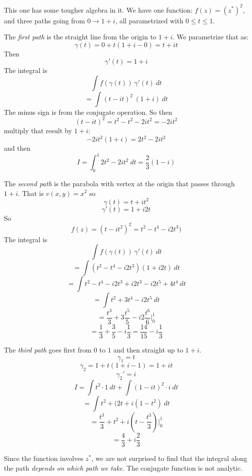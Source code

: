 \documentclass[11pt, oneside]{article}
\begin{document}
This one has some tougher algebra in it.  We have one function: $f(z) = (z^*)^2$, and three paths going from $0 \rightarrow 1 + i$, all parametrized with $0 \le t \le 1$.

The \emph{first path} is the straight line from the origin to $1 + i$.  We parametrize that as:
\[ \gamma(t) = 0 + t(1 + i - 0) = t + it \]
Then
\[ \gamma'(t) = 1 + i \]
The integral is
\[ \int f(\gamma(t)) \ \gamma'(t) \ dt \]
\[ = \int (t - it)^2 \ (1 + i) \ dt \]
The minus sign is from the conjugate operation.  So then
\[ (t - it)^2 = t^2 - t^2 - 2i t^2 = -2it^2 \]
multiply that result by $1 + i$:
\[ -2it^2 (1 + i) = 2t^2 -2it^2 \]
and then
\[ I = \int_0^1 2t^2 - 2it^2 \ dt = \frac{2}{3} (1 - i) \]

The \emph{second path} is the parabola with vertex at the origin that passes through $1 + i$.  That is $v(x,y) = x^2$ so
\[ \gamma(t) = t + it^2\]
\[ \gamma'(t) = 1 + i2t \]
So
\[ f(z) = (t - it^2)^2 = t^2 - t^4 - i2t^3) \]
The integral is
\[ \int f(\gamma(t)) \ \gamma'(t) \ dt \]
\[ = \int (t^2 - t^4 - i2t^3)(1 + i2t) \ dt \]
\[ = \int t^2 - t^4 - i2t^3 + i2t^3 - i2t^5 + 4t^4 \ dt \]
\[ = \int t^2 + 3t^4 - i 2t^5 \ dt \]
\[ = \frac{t^3}{3} + 3 \frac{t^5}{5} - i 2 \frac{t^6}{6} \bigg |_0^1 \]
\[ = \frac{1}{3} + \frac{3}{5} - i \frac{1}{3} = \frac{14}{15} - i \frac{1}{3} \]

The \emph{third path} goes first from $0$ to $1$ and then straight up to $1 + i$.
\[ \gamma_1 = t \]
\[ \gamma_2 = 1 + t(1 + i - 1) = 1 + it \]
\[ \gamma_2' = i \]
\[ I = \int t^2 \cdot 1 \ dt + \int (1 - it)^2 \cdot i \ dt \]
\[ = \int t^2 + (2t + i(1 - t^2) \ dt \]
\[ = \frac{t^3}{3} + t^2 + i (t - \frac{t^3}{3}) \bigg |_0^1 \]
\[ = \frac{4}{3} + i \frac{2}{3} \]

Since the function involves $z^*$, we are not surprised to find that the integral along the path \emph{depends on which path we take}.  The conjugate function is not analytic.
\end{document}
